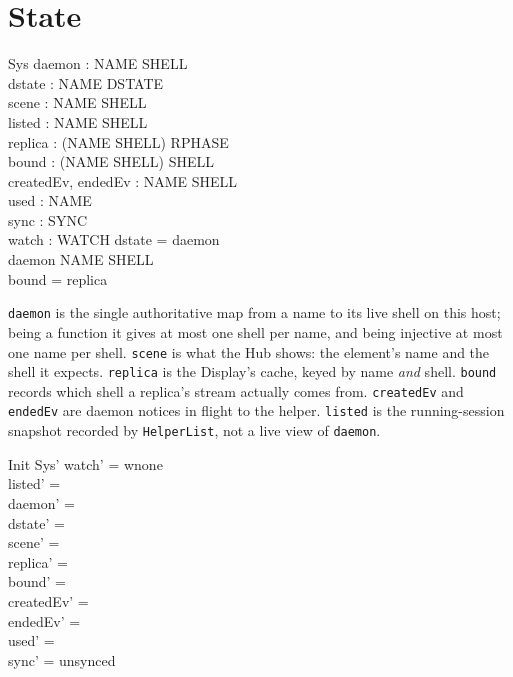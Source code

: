 \documentclass[a4paper,10pt,fleqn]{article}
\begin{document}
\section{State}

\begin{schema}{Sys}
  daemon : NAME \pfun SHELL \\
  dstate : NAME \pfun DSTATE \\
  scene : NAME \pfun SHELL \\
  listed : NAME \pfun SHELL \\
  replica : (NAME \cross SHELL) \pfun RPHASE \\
  bound : (NAME \cross SHELL) \pfun SHELL \\
  createdEv, endedEv : NAME \rel SHELL \\
  used : \power NAME \\
  sync : SYNC \\
  watch : WATCH
\where
  \dom dstate = \dom daemon \\
  daemon \in NAME \pinj SHELL \\
  \dom bound = \dom replica
\end{schema}

\texttt{daemon} is the single authoritative map from a name to its live
shell on this host; being a function it gives at most one shell per
name, and being injective at most one name per shell.  \texttt{scene}
is what the Hub shows: the element's name and the shell it expects.
\texttt{replica} is the Display's cache, keyed by name \emph{and} shell.
\texttt{bound} records which shell a replica's stream actually comes
from.  \texttt{createdEv} and \texttt{endedEv} are daemon notices in
flight to the helper. \texttt{listed} is the running-session snapshot
recorded by \texttt{HelperList}, not a live view of \texttt{daemon}.

\begin{schema}{Init}
  Sys'
\where
  watch' = wnone \\
  listed' = \emptyset \\
  daemon' = \emptyset \\
  dstate' = \emptyset \\
  scene' = \emptyset \\
  replica' = \emptyset \\
  bound' = \emptyset \\
  createdEv' = \emptyset \\
  endedEv' = \emptyset \\
  used' = \emptyset \\
  sync' = unsynced
\end{schema}
\end{document}
